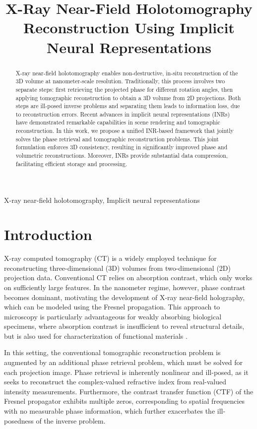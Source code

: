 \documentclass{article}
\title{X-Ray Near-Field Holotomography Reconstruction Using Implicit Neural Representations}
\begin{document}
%
\maketitle
%
\begin{abstract}
X-ray near-field holotomography enables non-destructive, in-situ reconstruction of the 3D volume at nanometer-scale resolution.
Traditionally, this process involves two separate steps: first retrieving the projected phase for different rotation angles, then applying tomographic reconstruction to obtain a 3D volume from 2D projections.
Both steps are ill-posed inverse problems and separating them leads to information loss, due to reconstruction errors.
Recent advances in implicit neural representations (INRs) have demonstrated remarkable capabilities in scene rendering and tomographic reconstruction.
In this work, we propose a unified INR-based framework that jointly solves the phase retrieval and tomographic reconstruction problems.
This joint formulation enforces 3D consistency, resulting in significantly improved phase and volumetric reconstructions.
Moreover, INRs provide substantial data compression, facilitating efficient storage and processing.
\end{abstract}
%
\begin{keywords}
X-ray near-field holotomography, Implicit neural representations
\end{keywords}
%
\section{Introduction}
\label{sec:intro}
X-ray computed tomography (CT) is a widely employed technique for reconstructing three-dimensional (3D) volumes from two-dimensional (2D) projection data.
Conventional CT relies on absorption contrast, which only works on sufficiently large features. 
In the nanometer regime, however, phase contrast becomes dominant, motivating the development of X-ray near-field holography, which can be modeled using the Fresnel propagation.
This approach to microscopy is particularly advantageous for weakly absorbing biological specimens, where absorption contrast is insufficient to reveal structural details, but is also used for characterization of functional materials \cite{vesely3DXrayNanotomography2021a,flennerHardXrayNanoholotomography2020b,gerhardtThreedimensionalArchitectureLinearized2025,reimersDevelopmentBioreactorCoupledFlowCell2023}.

In this setting, the conventional tomographic reconstruction problem is augmented by an additional phase retrieval problem, which must be solved for each projection image.
Phase retrieval is inherently nonlinear and ill-posed, as it seeks to reconstruct the complex-valued refractive index from real-valued intensity measurements.
Furthermore, the contrast transfer function (CTF) of the Fresnel propagator exhibits multiple zeros, corresponding to spatial frequencies with no measurable phase information, which further exacerbates the ill-posedness of the inverse problem.
\end{document}
